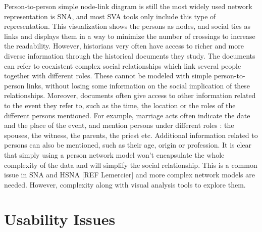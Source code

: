Person-to-person simple node-link diagram is still the most widely used network representation is SNA, and most SVA tools only include this type of representation. This visualization shows the persons as nodes, and social ties as links and displays them in a way to minimize the number of crossings to increase the readability. However, historians very often have access to richer and more diverse information through the historical documents they study. The documents can refer to coexistent complex social relationships which link several people together with different roles. These cannot be modeled with simple person-to-person links, without losing some information on the social implication of these relationships. Moreover, documents often give access to other information related to the event they refer to, such as the time, the location or the roles of the different persons mentioned. For example, marriage acts often indicate the date and the place of the event, and mention persons under different roles : the spouses, the witness, the parents, the priest etc. Additional information related to persons can also be mentioned, such as their age, origin or profession. It is clear that simply using a person network model won’t encapsulate the whole complexity of the data and will simplify the social relationship. This is a common issue in SNA and HSNA [REF Lemercier] and more complex network models are needed. However, complexity
along with visual analysis tools to explore them.

\section{Usability Issues}

